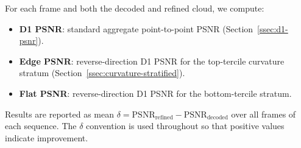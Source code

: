 For each frame and both the decoded and refined cloud, we compute:
\begin{itemize}
  \item \textbf{D1 PSNR}: standard aggregate point-to-point PSNR
    (Section~\ref{ssec:d1-psnr}).
  \item \textbf{Edge PSNR}: reverse-direction D1 PSNR for the top-tercile
    curvature stratum (Section~\ref{ssec:curvature-stratified}).
  \item \textbf{Flat PSNR}: reverse-direction D1 PSNR for the bottom-tercile
    stratum.
\end{itemize}
Results are reported as mean $\delta = \text{PSNR}_{\text{refined}} - \text{PSNR}_{\text{decoded}}$
over all frames of each sequence.
The $\delta$ convention is used throughout so that positive values indicate improvement.

